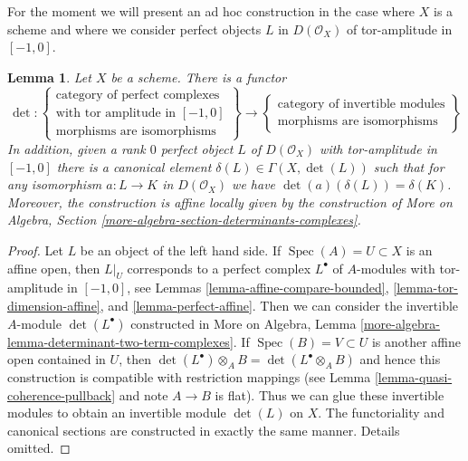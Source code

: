 \documentclass{stacks-project}
\theoremstyle{plain}
\newtheorem{lemma}[subsection]{Lemma}
\theoremstyle{definition}
\theoremstyle{remark}
\numberwithin{equation}{subsection}
\def\Spec{\mathop{\mathrm{Spec}}}
\begin{document}
\medskip\noindent
For the moment we will present an ad hoc construction in the case
where $X$ is a scheme and where we consider perfect objects $L$ in
$D(\mathcal{O}_X)$ of tor-amplitude in $[-1, 0]$.

\begin{lemma}
\label{lemma-determinant-two-term-complexes}
Let $X$ be a scheme. There is a functor
$$
\det :
\left\{
\begin{matrix}
\text{category of perfect complexes} \\
\text{with tor amplitude in }[-1, 0] \\
\text{morphisms are isomorphisms}
\end{matrix}
\right\}
\longrightarrow
\left\{
\begin{matrix}
\text{category of invertible modules} \\
\text{morphisms are isomorphisms}
\end{matrix}
\right\}
$$
In addition, given a rank $0$ perfect object $L$ of $D(\mathcal{O}_X)$ with
tor-amplitude in $[-1, 0]$ there is a canonical element
$\delta(L) \in \Gamma(X, \det(L))$ such that for any isomorphism
$a : L \to K$ in $D(\mathcal{O}_X)$ we have $\det(a)(\delta(L)) = \delta(K)$.
Moreover, the construction is affine locally given by the construction
of More on Algebra, Section \ref{more-algebra-section-determinants-complexes}.
\end{lemma}

\begin{proof}
Let $L$ be an object of the left hand side. If $\Spec(A) = U \subset X$
is an affine open, then $L|_U$ corresponds to a perfect complex $L^\bullet$
of $A$-modules with tor-amplitude in $[-1, 0]$, see
Lemmas \ref{lemma-affine-compare-bounded},
\ref{lemma-tor-dimension-affine}, and
\ref{lemma-perfect-affine}.
Then we can consider the invertible $A$-module $\det(L^\bullet)$ constructed in
More on Algebra, Lemma \ref{more-algebra-lemma-determinant-two-term-complexes}.
If $\Spec(B) = V \subset U$ is another affine open contained in $U$,
then $\det(L^\bullet) \otimes_A B = \det(L^\bullet \otimes_A B)$
and hence this construction is compatible with restriction mappings
(see Lemma \ref{lemma-quasi-coherence-pullback} and note $A \to B$ is flat).
Thus we can glue these invertible modules to obtain an invertible module
$\det(L)$ on $X$. The functoriality and canonical sections
are constructed in exactly the same manner. Details omitted.
\end{proof}
\end{document}
